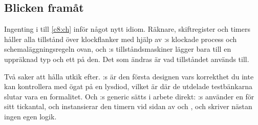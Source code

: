 \subsection*{Blicken framåt}
Ingenting i  till \ref{c8:ch} inför något nytt idiom. Räknare, skiftregister och
timers håller alla tillstånd över klockflanker med hjälp av :s klockade process och
schemaläggningsregeln ovan, och :s tillståndsmaskiner lägger bara till en uppräknad
typ och ett  på den. Det som ändras är vad tillståndet används till.

Två saker att hålla utkik efter. :s  är den första designen vars
korrekthet du inte kan kontrollera med ögat på en lysdiod, vilket är där de utdelade testbänkarna
slutar vara en formalitet. Och :s generic sätts i arbete direkt:
:s  använder en för sitt tickantal, och  instansierar
den timern vid sidan av  och , och skriver nästan ingen egen
logik.
